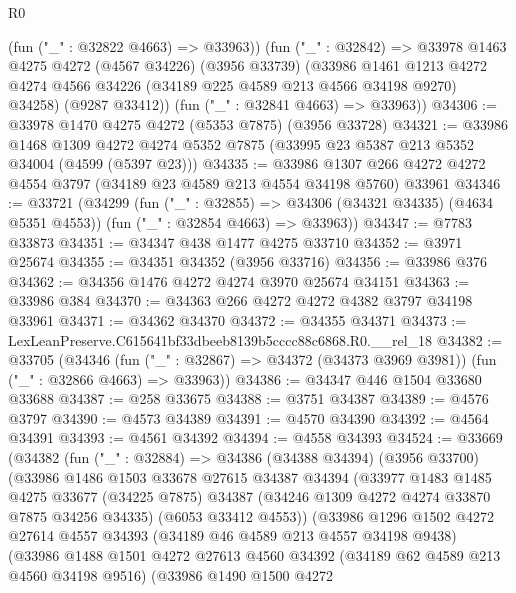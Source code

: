 \begin{lexlean}{R0}
\begin{coremodule}
        (fun ("_" : @32822 @4663) => @33963))
      (fun ("_" : @32842) =>
      @33978
        @1463
        @4275
        @4272
        (@4567 @34226)
        (@3956 @33739)
        (@33986
          @1461
          @1213
          @4272
          @4274
          @4566
          @34226
          (@34189 @225 @4589 @213 @4566 @34198 @9270)
          @34258)
        (@9287 @33412))
      (fun ("_" : @32841 @4663) => @33963))
@34306 := @33978 @1470 @4275 @4272 (@5353 @7875) (@3956 @33728)
@34321 := @33986
    @1468
    @1309
    @4272
    @4274
    @5352
    @7875
    (@33995 @23 @5387 @213 @5352 @34004 (@4599 (@5397 @23)))
@34335 := @33986
    @1307
    @266
    @4272
    @4272
    @4554
    @3797
    (@34189 @23 @4589 @213 @4554 @34198 @5760)
    @33961
@34346 := @33721
    (@34299
      (fun ("_" : @32855) => @34306 (@34321 @34335) (@4634 @5351 @4553))
      (fun ("_" : @32854 @4663) => @33963))
@34347 := @7783 @33873
@34351 := @34347 @438 @1477 @4275 @33710
@34352 := @3971 @25674
@34355 := @34351 @34352 (@3956 @33716)
@34356 := @33986 @376
@34362 := @34356 @1476 @4272 @4274 @3970 @25674 @34151
@34363 := @33986 @384
@34370 := @34363 @266 @4272 @4272 @4382 @3797 @34198 @33961
@34371 := @34362 @34370
@34372 := @34355 @34371
@34373 := LexLeanPreserve.C615641bf33dbeeb8139b5cccc88c6868.R0.__rel_18
@34382 := @33705
    (@34346
      (fun ("_" : @32867) => @34372 (@34373 @3969 @3981))
      (fun ("_" : @32866 @4663) => @33963))
@34386 := @34347 @446 @1504 @33680 @33688
@34387 := @258 @33675
@34388 := @3751 @34387
@34389 := @4576 @3797
@34390 := @4573 @34389
@34391 := @4570 @34390
@34392 := @4564 @34391
@34393 := @4561 @34392
@34394 := @4558 @34393
@34524 := @33669
    (@34382
      (fun ("_" : @32884) =>
      @34386
        (@34388 @34394)
        (@3956 @33700)
        (@33986
          @1486
          @1503
          @33678
          @27615
          @34387
          @34394
          (@33977
            @1483
            @1485
            @4275
            @33677
            (@34225 @7875)
            @34387
            (@34246 @1309 @4272 @4274 @33870 @7875 @34256 @34335)
            (@6053 @33412 @4553))
          (@33986
            @1296
            @1502
            @4272
            @27614
            @4557
            @34393
            (@34189 @46 @4589 @213 @4557 @34198 @9438)
            (@33986
              @1488
              @1501
              @4272
              @27613
              @4560
              @34392
              (@34189 @62 @4589 @213 @4560 @34198 @9516)
              (@33986
                @1490
                @1500
                @4272

\end{coremodule}
\end{lexlean}
